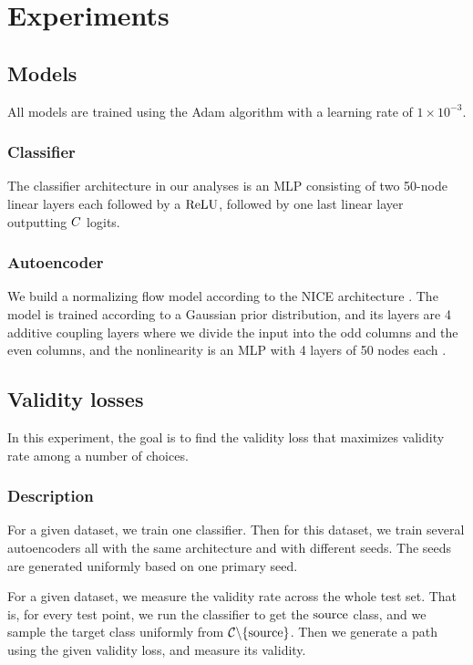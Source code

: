 \documentclass[../main.tex]{subfiles}
\begin{document}
\chapter{Experiments}

\section{Models}

All models are trained using the Adam algorithm \cite{kingmaAdam2014} with a learning rate of $1 \times 10^{-3}$.

\subsection{Classifier}

The classifier architecture in our analyses is an MLP consisting of two 50-node linear layers each followed by a $\text{ReLU}$, followed by one last linear layer outputting $C$ logits.

\subsection{Autoencoder}

We build a normalizing flow model according to the NICE architecture \cite{dinhNICE2015}.
The model is trained according to a Gaussian prior distribution, and its layers are 4 additive coupling layers where we divide the input into the odd columns and the even columns, and the nonlinearity is an MLP with 4 layers of 50 nodes each .

\section{Validity losses}

In this experiment, the goal is to find the validity loss that maximizes validity rate among a number of choices.

\subsection{Description}
\label{validity_losses/description}

For a given dataset, we train one classifier.
Then for this dataset, we train several autoencoders all with the same architecture and with different seeds.
The seeds are generated uniformly based on one primary seed.

For a given dataset, we measure the validity rate across the whole test set.
That is, for every test point, we run the classifier to get the $\mathrm{source}$ class, and we sample the target class uniformly from $\mathcal{C} \backslash \{\mathrm{source}\}$.
Then we generate a path using the given validity loss, and measure its validity.
\end{document}
